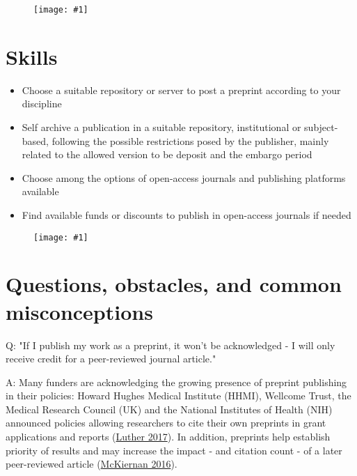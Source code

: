 \documentclass{article}
\newlength{\imgwidth}
\newcommand\scaledgraphics[2]{%
                
\settowidth{\imgwidth}{\texttt{[image: \#1]}}%
                
\setlength{\imgwidth}{\minof{\imgwidth}{#2\textwidth}}%
                
\texttt{[image: \#1]}%
                
}
\begin{document}
\begin{figure}
\scaledgraphics{965a9b22-10b4-4501-a490-83443a94eafb.png}{1}
\label{F22429701}
\end{figure}


\section{Skills}\label{skills}


\begin{itemize}
\item Choose a suitable repository or server to post a preprint according to your discipline


\item Self archive a publication in a suitable repository, institutional or subject-based, following the possible restrictions posed by the publisher, mainly related to the allowed version to be deposit and the embargo period


\item Choose among the options of open-access journals and publishing platforms available


\item Find available funds or discounts to publish in open-access journals if needed


\end{itemize}
\begin{figure}
\scaledgraphics{2b202773-ec41-4cde-8558-44800112ec6d.png}{1}
\label{F72338871}
\end{figure}


\section{Questions, obstacles, and common misconceptions}\label{questions-obstacles-and-common-misconceptions}



Q: "If I publish my work as a preprint, it won’t be acknowledged - I will only receive credit for a peer-reviewed journal article."


A: Many funders are acknowledging the growing presence of preprint publishing in their policies: Howard Hughes Medical Institute (HHMI), Wellcome Trust, the Medical Research Council (UK) and the National Institutes of Health (NIH) announced policies allowing researchers to cite their own preprints in grant applications and reports (\href{https://scholarlykitchen.sspnet.org/2017/04/18/stars-aligning-preprints/}{Luther 2017}). In addition, preprints help establish priority of results and may increase the impact - and citation count - of a later peer-reviewed article (\href{https://doi.org/10/gbqsng}{McKiernan 2016}).
\end{document}
